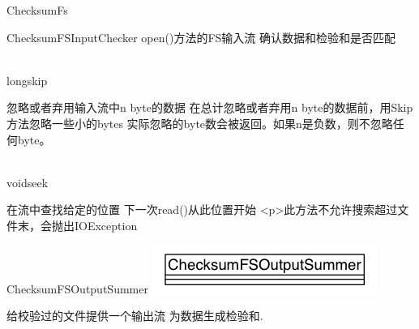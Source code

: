 \begin{XeClass}{ChecksumFs}
\begin{XeInnerClass}{ChecksumFSInputChecker}
 open()方法的FS输入流
 确认数据和检验和是否匹配

        \begin{XeMethod}{\XePublic \\ \XeSync}{long}{skip}
             
 忽略或者弃用输入流中n byte的数据
 在总计忽略或者弃用n byte的数据前，用Skip方法忽略一些小的bytes
 实际忽略的byte数会被返回。如果n是负数，则不忽略任何byte。

        \end{XeMethod}

        \begin{XeMethod}{\XePublic \\ \XeSync}{void}{seek}
             
 在流中查找给定的位置
 下一次read()从此位置开始
 <p>此方法不允许搜索超过文件末，会抛出IOException

        \end{XeMethod}

    \end{XeInnerClass}
    \begin{XeInnerClass}{ChecksumFSOutputSummer}
\includegraphics[width=\textwidth]{cdig/ChecksumFSOutputSummer.png}
         
 给校验过的文件提供一个输出流
 为数据生成检验和.

    \end{XeInnerClass}
\end{XeClass}
